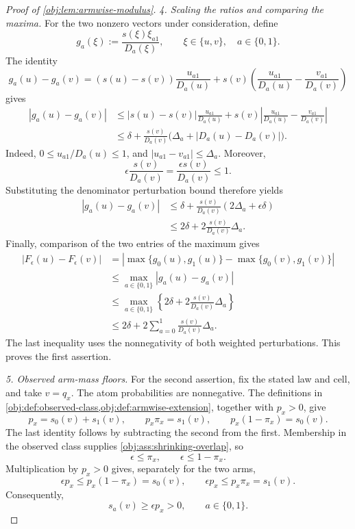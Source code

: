 \begin{proof}[Proof of \cref{obj:lem:armwise-modulus}]
\emph{4. Scaling the ratios and comparing the maxima.}
For the two nonzero vectors under consideration, define
\[
g_a(\xi):=\frac{s(\xi)\xi_{a1}}{D_a(\xi)},
\qquad \xi\in\{u,v\},\quad a\in\{0,1\}.
\]
The identity
\[
g_a(u)-g_a(v)
=
(s(u)-s(v))\frac{u_{a1}}{D_a(u)}
+s(v)\left(\frac{u_{a1}}{D_a(u)}
           -\frac{v_{a1}}{D_a(v)}\right)
\]
gives
\[
\begin{aligned}
|g_a(u)-g_a(v)|
&\leq |s(u)-s(v)|\frac{u_{a1}}{D_a(u)}
+s(v)\left|\frac{u_{a1}}{D_a(u)}
           -\frac{v_{a1}}{D_a(v)}\right|\\
&\leq\delta+
\frac{s(v)}{D_a(v)}
\bigl(\Delta_a+|D_a(u)-D_a(v)|\bigr).
\end{aligned}
\]
Indeed, \(0\leq u_{a1}/D_a(u)\leq1\), and
\(
|u_{a1}-v_{a1}|\leq\Delta_a
\).
Moreover,
\[
\epsilon\frac{s(v)}{D_a(v)}
=\frac{\epsilon s(v)}{D_a(v)}\leq1.
\]
Substituting the denominator perturbation bound therefore yields
\[
\begin{aligned}
|g_a(u)-g_a(v)|
&\leq\delta+
\frac{s(v)}{D_a(v)}(2\Delta_a+\epsilon\delta)\\
&\leq2\delta+2\frac{s(v)}{D_a(v)}\Delta_a.
\end{aligned}
\]
Finally, comparison of the two entries of the maximum gives
\[
\begin{aligned}
|F_\epsilon(u)-F_\epsilon(v)|
&=|\max\{g_0(u),g_1(u)\}-\max\{g_0(v),g_1(v)\}|\\
&\leq\max_{a\in\{0,1\}}|g_a(u)-g_a(v)|\\
&\leq\max_{a\in\{0,1\}}
 \left\{2\delta+2\frac{s(v)}{D_a(v)}\Delta_a\right\}\\
&\leq2\delta+
2\sum_{a=0}^1\frac{s(v)}{D_a(v)}\Delta_a.
\end{aligned}
\]
The last inequality uses the nonnegativity of both weighted perturbations. This proves the first assertion.

\emph{5. Observed arm-mass floors.}
For the second assertion, fix the stated law and cell, and take \(v=q_x\). The atom probabilities are nonnegative. The definitions in \cref{obj:def:observed-class,obj:def:armwise-extension}, together with \(p_x>0\), give
\[
p_x=s_0(v)+s_1(v),\qquad
p_x\pi_x=s_1(v),\qquad
p_x(1-\pi_x)=s_0(v).
\]
The last identity follows by subtracting the second from the first. Membership in the observed class supplies \cref{obj:ass:shrinking-overlap}, so
\[
\epsilon\leq\pi_x,\qquad \epsilon\leq1-\pi_x.
\]
Multiplication by \(p_x>0\) gives, separately for the two arms,
\[
\epsilon p_x\leq p_x(1-\pi_x)=s_0(v),
\qquad
\epsilon p_x\leq p_x\pi_x=s_1(v).
\]
Consequently,
\[
s_a(v)\geq\epsilon p_x>0,\qquad a\in\{0,1\}.
\]


\end{proof}
